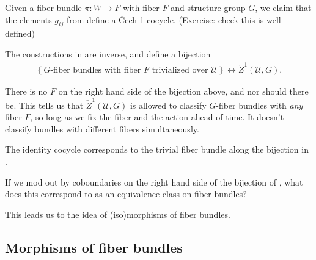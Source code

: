 \documentclass[11pt]{book}
\begin{document}
\begin{construction}
\label{constr:cocycle-from-fiber-bundle}
Given a fiber bundle $\pi \colon W \to F$ with fiber $F$ and structure group $G$, we claim that the elements $g_{ij}$ from  define a \v{C}ech 1-cocycle. (Exercise: check this is well-defined)
\end{construction}

\begin{theorem}\label{thm:Z1-bij-to-fiber-bundles} 
The constructions in  are inverse, and define a bijection
\begin{equation}\label{eqn:cocycle-fiber-bundle-bijection}
\begin{aligned}
    \left\{ G\text{-fiber bundles with fiber }F\text{ trivialized over }\mathcal{U} \right\} \leftrightarrow \check{Z}^1(\mathcal{U},G).
\end{aligned}
\end{equation}
\end{theorem}

\begin{remark}[Important] There is no $F$ on the right hand side of the bijection above, and nor should there be. This tells us that $\check{Z}^1(\mathcal{U},G)$ is allowed to classify $G$-fiber bundles with \emph{any} fiber $F$, so long as we fix the fiber and the action ahead of time. It doesn't classify bundles with different fibers simultaneously.
\end{remark}


\begin{example}
\label{exa:identity-cocycle-trivial-fiber-bundle}
The identity cocycle corresponds to the trivial fiber bundle along the bijection in .
\end{example}


\begin{question} If we mod out by coboundaries on the right hand side of the bijection of , what does this correspond to as an equivalence class on fiber bundles?
\end{question}

This leads us to the idea of (iso)morphisms of fiber bundles.

\subsection{Morphisms of fiber bundles}
\end{document}
